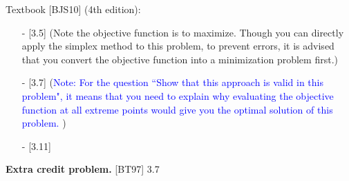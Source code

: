 \documentclass[11pt]{article}
\newcommand{\1}{\mathbf{1}}
\begin{document}
Textbook [BJS10] (4th edition): 
\begin{enumerate}
\item[-] [3.5] (Note the objective function is to maximize. Though you can directly apply the simplex method to this problem, to prevent errors, 
it is advised that you convert the objective function into a minimization problem first.)\\

\item[-] [3.7] (\textcolor{blue}{Note: For the question ``Show that this approach is valid in this problem", 
it means that you need to explain why evaluating the objective function at all extreme points would give you the optimal solution of this problem. })\\

\item[-] [3.11] \\[10pt]

\end{enumerate} 

\textbf{Extra credit problem.} [BT97] 3.7
\end{document}
